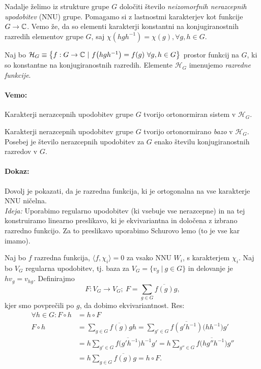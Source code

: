 Nadalje \v zelimo iz strukture grupe $G$ dolo\v citi \v stevilo \emph{neizomorfnih nerazcepnih upodobitev} (NNU) grupe. Pomagamo si
z lastnostmi karakterjev kot funkcije $G \to \mathbb{C}$. Vemo \v ze, da so elementi karakterji konstantni na konjugiranostnih razredih
elementov grupe $G$, saj $\chi(hgh^{-1}) = \chi(g), \forall g,h \in G$.

\begin{defin}
	Naj bo $\mathcal{H}_G \equiv \big\{f : G \to \mathbb{C}\ |\ f\big(hgh^{-1}\big) = f(g)\ \forall g,h \in G\big\}$ prostor funkcij na
	$G$, ki so konstantne na konjugiranostnih razredih. Elemente $\mathcal{H}_G$ imenujemo {\em razredne funkcije}.
\end{defin}

\paragraph{Vemo:} Karakterji nerazcepnih upodobitev grupe $G$ tvorijo ortonormiran sistem v $\mathcal{H}_G$.

\begin{trditev}
	Karakterji nerazcepnih upodobitev grupe $G$ tvorijo ortonormirano \emph{bazo} v $\mathcal{H}_G$. Posebej je \v stevilo
	nerazcepnih upodobitev za $G$ enako \v stevilu konjugiranostnih razredov v $G$.
\end{trditev}

\paragraph{Dokaz:} Dovolj je pokazati, da je razredna funkcija, ki je ortogonalna na vse karakterje NNU ni\v celna.\\

\emph{Ideja:} Uporabimo regularno upodobitev (ki vsebuje vse nerazcepne) in na tej konstruiramo linearno preslikavo, ki je
ekvivariantna in dolo\v cena z izbrano razredno funkcijo. Za to preslikavo uporabimo Schurovo lemo (to je vse kar imamo).

Naj bo $f$ razredna funkcija, $\langle f, \chi_i\rangle = 0$ za vsako NNU $W_i$, s karakterjem $\chi_i$. Naj bo $V_G$ regularna
upodobitev, tj. baza za $V_G = \{v_g\ |\ g \in G\}$ in delovanje je $hv_g = v_{hg}$. Definirajmo
\[
	F : V_G \to V_G;\ F = \sum_{g \in G}\overline{f(g)}g,
\]
kjer smo povpre\v cili po $g$, da dobimo ekvivariantnost. Res:
\begin{align*}
	\forall h \in G : F \circ h &= h \circ F \\
	F \circ h &= \sum_{g \in G}\overline{f(g)}gh = \sum_{g' \in G} \overline{f(g'h^{-1})}\big(hh^{-1}\big)g' \\
	&= h \sum_{g' \in G}\overline{f\big(g'h^{-1}\big)}h^{-1}g' = h \sum_{g'' \in G} \overline{f\big(hg''h^{-1}\big)}g'' \\
	&= h \sum_{g \in G} \overline{f(g)} g = h \circ F.
\end{align*}

